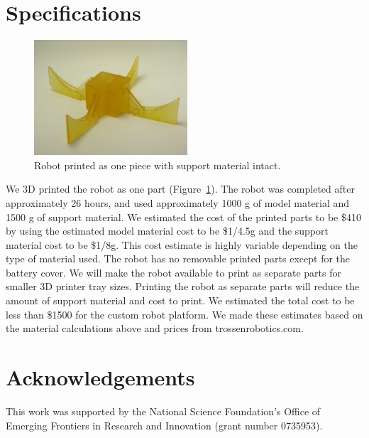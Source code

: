 \documentclass[letterpaper]{article}
\begin{document}
\section{Specifications}
\begin{figure}[t]
\begin{center}
\includegraphics[width=2.25in,angle=0]{fig2.jpg}
\caption{Robot printed as one piece with support material intact.}
\label{fig2}
\end{center}
\end{figure}
We 3D printed the robot as one part (Figure~\ref{fig2}). The robot was completed after approximately 26 hours, and used approximately 1000 g of model material and 1500 g of support material. We estimated the cost of the printed parts to be \$410 by using the estimated model material cost to be \$1/4.5g and the support material cost to be \$1/8g. This cost estimate is highly variable depending on the type of material used. The robot has no removable printed parts except for the battery cover. We will make the robot available to print as separate parts for smaller 3D printer tray sizes. Printing the robot as separate parts will reduce the amount of support material and cost to print. We estimated the total cost to be less than \$1500 for the custom robot platform. We made these estimates based on the material calculations above and prices from trossenrobotics.com.

\begin{table}[h]
\vskip 0.25cm
\caption{Estimated total cost. A specifiic parts list is on our website \citep{WEB}.}
\end{table}



\section{Acknowledgements}

This work was supported by
the National Science Foundation's Office of Emerging Frontiers in Research and Innovation (grant number 0735953).


\footnotesize


\end{document}
